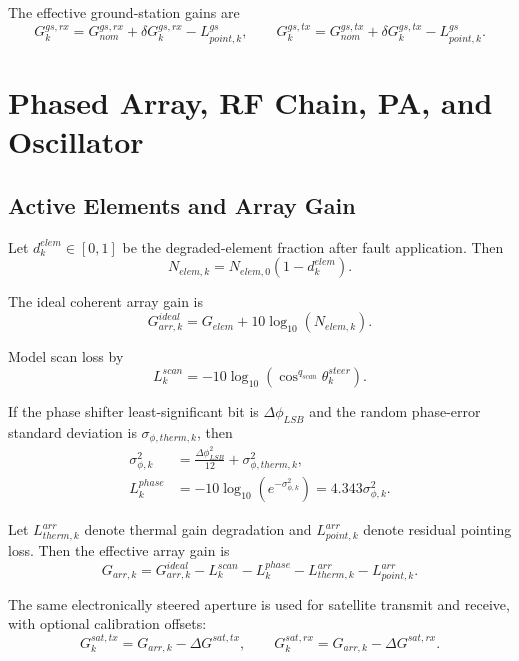 \documentclass[11pt]{article}
\begin{document}
The effective ground-station gains are
\begin{equation}
  G^{gs,rx}_k = G^{gs,rx}_{nom} + \delta G^{gs,rx}_k - L^{gs}_{point,k},
  \qquad
  G^{gs,tx}_k = G^{gs,tx}_{nom} + \delta G^{gs,tx}_k - L^{gs}_{point,k}.
\end{equation}

\section{Phased Array, RF Chain, PA, and Oscillator}

\subsection{Active Elements and Array Gain}

Let $d^{elem}_k \in [0,1]$ be the degraded-element fraction after fault application.
Then
\begin{equation}
  N_{elem,k} = N_{elem,0}(1-d^{elem}_k).
\end{equation}

The ideal coherent array gain is
\begin{equation}
  G^{ideal}_{arr,k} = G_{elem} + 10 \log_{10}(N_{elem,k}).
\end{equation}

Model scan loss by
\begin{equation}
  L^{scan}_k = -10 \log_{10}\left( \cos^{q_{scan}} \theta^{steer}_k \right).
\end{equation}

If the phase shifter least-significant bit is $\Delta \phi_{LSB}$ and the random
phase-error standard deviation is $\sigma_{\phi,therm,k}$, then
\begin{align}
  \sigma^2_{\phi,k}
  &= \frac{\Delta \phi_{LSB}^2}{12} + \sigma_{\phi,therm,k}^2, \\
  L^{phase}_k
  &= -10 \log_{10}\left( e^{-\sigma^2_{\phi,k}} \right)
   = 4.343 \sigma^2_{\phi,k}.
\end{align}

Let $L^{arr}_{therm,k}$ denote thermal gain degradation and $L^{arr}_{point,k}$ denote
residual pointing loss. Then the effective array gain is
\begin{equation}
  G_{arr,k}
  =
  G^{ideal}_{arr,k}
  - L^{scan}_k
  - L^{phase}_k
  - L^{arr}_{therm,k}
  - L^{arr}_{point,k}.
\end{equation}

The same electronically steered aperture is used for satellite transmit and receive,
with optional calibration offsets:
\begin{equation}
  G^{sat,tx}_k = G_{arr,k} - \Delta G^{sat,tx},
  \qquad
  G^{sat,rx}_k = G_{arr,k} - \Delta G^{sat,rx}.
\end{equation}
\end{document}
